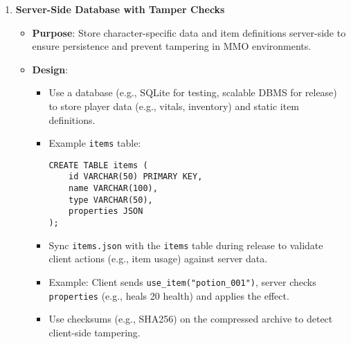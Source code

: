 \begin{enumerate}
    \item \textbf{Server-Side Database with Tamper Checks}
        \begin{itemize}
            \item \textbf{Purpose}: Store character-specific data and item definitions server-side to ensure persistence and prevent tampering in MMO environments.
            \item \textbf{Design}:
                \begin{itemize}
                    \item Use a database (e.g., SQLite for testing, scalable DBMS for release) to store player data (e.g., vitals, inventory) and static item definitions.
                    \item Example \texttt{items} table:
                    \begin{lstlisting}[style=htmlstyle]
CREATE TABLE items (
    id VARCHAR(50) PRIMARY KEY,
    name VARCHAR(100),
    type VARCHAR(50),
    properties JSON
);
                    \end{lstlisting}
                    \item Sync \texttt{items.json} with the \texttt{items} table during release to validate client actions (e.g., item usage) against server data.
                    \item Example: Client sends \texttt{use\_item("potion\_001")}, server checks \texttt{properties} (e.g., heals 20 health) and applies the effect.
                    \item Use checksums (e.g., SHA256) on the compressed archive to detect client-side tampering.
                \end{itemize}
        \end{itemize}


\end{enumerate}

